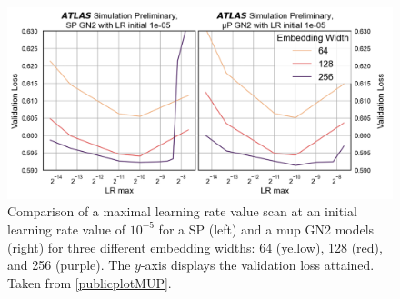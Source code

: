 \begin{figure}[h!]
  \centering
  \includegraphics[width=\textwidth]{Images/FTAG/GN/HPO/maincompmupsp.png}
  \caption{Comparison of a maximal learning rate value scan at an initial learning rate value of $10^{-5}$ for a SP (left) and a \gls{mup} GN2 models (right) for three different embedding widths: 64 (yellow), 128 (red), and 256 (purple). The $y$-axis displays the validation loss attained. Taken from \ref{publicplotMUP}.}
  \label{fig:maincompmupsp}
\end{figure} 

